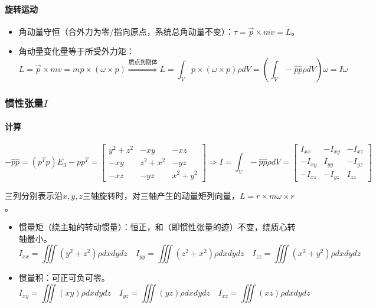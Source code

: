 \documentclass[
12pt, %
a4paper, 
oneside, %
headinclude,footinclude, %
]{scrartcl}
\begin{document}
\paragraph{旋转运动}
\begin{itemize}
\item 角动量守恒（合外力为零/指向原点，系统总角动量不变）：$ \tau = \vec{p} \times m\dot{v} = \dot{L} $。
\item 角动量变化量等于所受外力矩：
$$ 
L = \vec{p} \times mv = mp \times (\omega \times p)
\overset{\text{质点到刚体}}{\Longrightarrow}
L = \int_V p \times (\omega \times p) \rho dV = (\int_V -\hat{p}\hat{p}\rho dV) \omega = I\omega 
$$
\end{itemize} 
\subsubsection[惯性张量]{惯性张量$ I $}
\paragraph{计算}
$$
-\hat{p}\hat{p} = (p^Tp)E_3 - pp^T = \begin{bmatrix} y^2 + z^2 & -xy & -xz \\ -xy & z^2 + x^2 & -yz \\ -xz & -yz & x^2 + y^2 \end{bmatrix}
\Rightarrow
I = \int_V -\hat{p}\hat{p}\rho dV = \begin{bmatrix} I_{xx} & -I_{xy} & -I_{xz} \\ -I_{xy} & I_{yy} & -I_{yz} \\ -I_{xz} & -I_{yz} & I_{zz} \end{bmatrix}
$$

三列分别表示沿$ x,y,z $三轴旋转时，对三轴产生的动量矩列向量，$ L = r \times m \omega \times r $。
\begin{itemize}
\item 惯量矩（绕主轴的转动惯量）：恒正，和（即惯性张量的迹）不变，绕质心转轴最小。
$$ I_{xx} = \iiint (y^2 + z^2)\rho dxdydz \quad I_{yy} = \iiint (z^2 + x^2)\rho dxdydz \quad I_{zz} = \iiint (x^2 + y^2)\rho dxdydz $$
\item 惯量积：可正可负可零。
$$ I_{xy} = \iiint (xy)\rho dxdydz \quad I_{yz} = \iiint (yz)\rho dxdydz \quad I_{xz} = \iiint (xz)\rho dxdydz $$
\end{itemize} 
\end{document}
